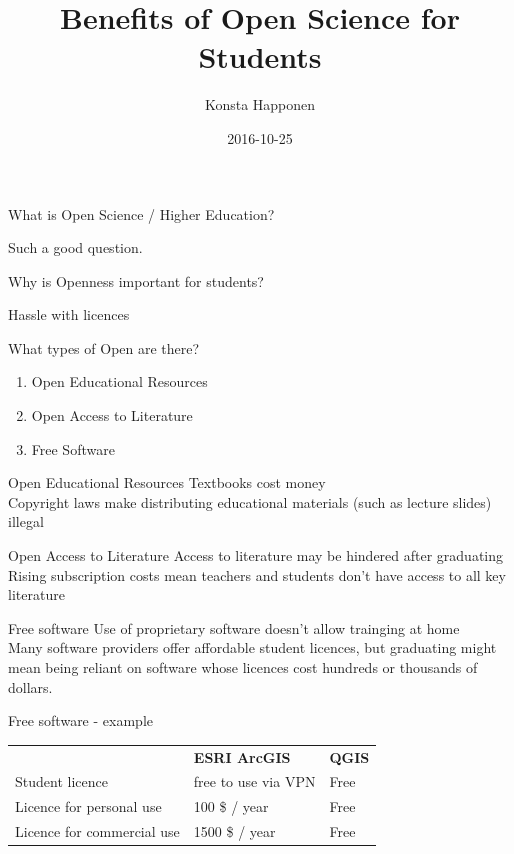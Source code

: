 \documentclass{beamer}
\title{Benefits of Open Science for Students}
\author{Konsta Happonen}
\institute{Open Knowledge Finland}
\date{2016-10-25}
\begin{document}
\maketitle


\begin{frame}{What is Open Science / Higher Education?}

  Such a good question.

\end{frame}

\begin{frame}{Why is Openness important for students?}

  Hassle with licences

\end{frame}

\begin{frame}{What types of Open are there?}
  \begin{enumerate}
  \item Open Educational Resources
  \item Open Access to Literature
  \item Free Software
  \end{enumerate}
\end{frame}

\begin{frame}{Open Educational Resources}
  Textbooks cost money\\
  Copyright laws make distributing educational materials (such as lecture slides) illegal
\end{frame}

\begin{frame}{Open Access to Literature}
  Access to literature may be hindered after graduating\\
  Rising subscription costs mean teachers and students don't have access to all key literature
\end{frame}

\begin{frame}{Free software}
  Use of proprietary software doesn't allow trainging at home\\
  Many software providers offer affordable student licences, but graduating might mean being reliant on software whose licences cost hundreds or thousands of dollars.\\
\end{frame}

\begin{frame}{Free software - example}
  \begin{tabularx}{\textwidth}{lXl}
     & \textbf{ESRI ArcGIS} & \textbf{QGIS}\\
    Student licence & free to use via VPN & Free\\
    Licence for personal use & 100 \$ / year & Free\\
    Licence for commercial use & 1500 \$ / year & Free
  \end{tabularx}
\end{frame}
\end{document}
